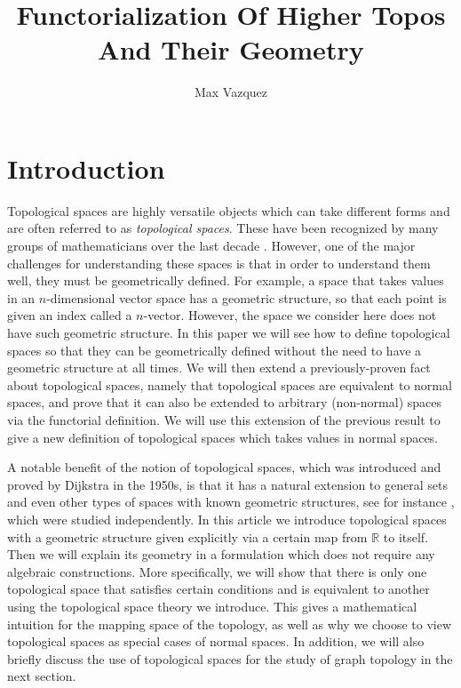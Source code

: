 \documentclass[a4paper,reqno,oneside]{article}
\begin{document}
\title{Functorialization Of Higher Topos And Their Geometry}
\author{Max Vazquez}
\maketitle


\section*{Introduction} 
Topological spaces are highly versatile objects which can take different forms and are often referred to as \emph{topological spaces}. These have been recognized by many groups of mathematicians over the last decade \cite{Vazquez:2009}. However, one of the major challenges for understanding these spaces is that in order to understand them well, they must be geometrically defined. For example, a space that takes values in an $n$-dimensional vector space has a geometric structure, so that each point is given an index called a $n$-vector. However, the space we consider here does not have such geometric structure. In this paper we will see how to define topological spaces so that they can be geometrically defined without the need to have a geometric structure at all times. We will then extend a previously-proven fact about topological spaces, namely that topological spaces are equivalent to normal spaces, and prove that it can also be extended to arbitrary (non-normal) spaces via the functorial definition.  We will use this extension of the previous result to give a new definition of topological spaces which takes values in normal spaces. 

A notable benefit of the notion of topological spaces, which was introduced and proved by Dijkstra in the 1950s, is that it has a natural extension to general sets and even other types of spaces with known geometric structures, see for instance \cite{Dijkstra:1968,Drucker:1967}, which were studied independently. In this article we introduce topological spaces with a geometric structure given explicitly via a certain map from $\mathbb{R}$ to itself. Then we will explain its geometry in a formulation which does not require any algebraic constructions. More specifically, we will show that there is only one topological space that satisfies certain conditions and is equivalent to another using the topological space theory we introduce. This gives a mathematical intuition for the mapping space of the topology, as well as why we choose to view topological spaces as special cases of normal spaces. In addition, we will also briefly discuss the use of topological spaces for the study of graph topology in the next section. 
\end{document}
